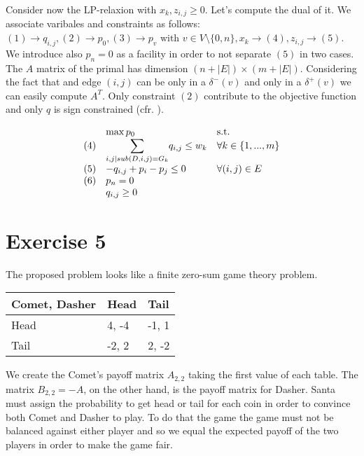 \documentclass[paper=a4, fontsize=11pt]{scrartcl} %
\numberwithin{equation}{section} %
\numberwithin{figure}{section} %
\numberwithin{table}{section} %
\begin{document}
Consider now the LP-relaxion with $x_k, z_{i,j} \geq 0$. Let's compute the dual of it.
We associate varibales and constraints as follows: $(1) \rightarrow q_{i,j}, (2) \rightarrow p_0, (3) \rightarrow p_v \text{ with } v \in V \setminus \{0,n\}, x_k \rightarrow (4), z_{i,j} \rightarrow (5)$. We introduce also $p_n = 0$ as a facility in order to not separate $(5)$ in two cases.
The $A$ matrix of the primal has dimension $(n+|E|)\times(m+|E|)$. Considering the fact that and edge $(i,j)$ can be only in a $\delta^-(v)$ and only in a $\delta^+(v)$ we can easily compute $A^T$.
Only constraint $(2)$ contribute to the objective function and only $q$ is sign constrained (cfr. \cite{cap8roma}).

\[
    \begin{array}{lll}
    & \max p_0 & \text{s.t.} \\
    (4) & \mathlarger{\sum}_{i,j | sub(D,i,j)=G_k} q_{i,j} \leq w_k & \forall k \in \{1,...,m\}\\
    (5) & -q_{i,j} +p_i -p_j \leq 0 & \forall (i,j) \in E\\
    (6) & p_n = 0 & \\
    & q_{i,j} \geq 0 & \\
    \end{array}
\]

\newpage
\section{Exercise 5}

The proposed problem looks like a finite zero-sum game theory problem.

\begin{center}
    \begin{tabular}{ | l | l | l | }
        \hline
        Comet, Dasher & Head & Tail \\ \hline
        Head & 4, -4 & -1, 1 \\ \hline
        Tail & -2, 2 & 2, -2 \\ \hline
    \end{tabular}
\end{center}

We create the Comet's payoff matrix $A_{2,2}$ taking the first value of each table. The matrix $B_{2,2} = -A$, on the other hand, is the payoff matrix for Dasher.
Santa must assign the probability to get head or tail for each coin in order to convince both Comet and Dasher to play.
To do that the game the game must not be balanced against either player and so we equal the expected payoff of the two players in order to make the game fair.
\end{document}
